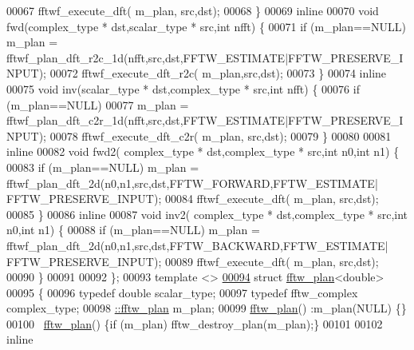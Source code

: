 \begin{DoxyCode}
00067           fftwf\_execute\_dft( m\_plan, src,dst);
00068       \}
00069       \textcolor{keyword}{inline}
00070       \textcolor{keywordtype}{void} fwd(complex\_type * dst,scalar\_type * src,\textcolor{keywordtype}{int} nfft) \{
00071           \textcolor{keywordflow}{if} (m\_plan==NULL) m\_plan = fftwf\_plan\_dft\_r2c\_1d(nfft,src,dst,FFTW\_ESTIMATE|FFTW\_PRESERVE\_INPUT);
00072           fftwf\_execute\_dft\_r2c( m\_plan,src,dst);
00073       \}
00074       \textcolor{keyword}{inline}
00075       \textcolor{keywordtype}{void} inv(scalar\_type * dst,complex\_type * src,\textcolor{keywordtype}{int} nfft) \{
00076           \textcolor{keywordflow}{if} (m\_plan==NULL)
00077               m\_plan = fftwf\_plan\_dft\_c2r\_1d(nfft,src,dst,FFTW\_ESTIMATE|FFTW\_PRESERVE\_INPUT);
00078           fftwf\_execute\_dft\_c2r( m\_plan, src,dst);
00079       \}
00080 
00081       \textcolor{keyword}{inline} 
00082       \textcolor{keywordtype}{void} fwd2( complex\_type * dst,complex\_type * src,\textcolor{keywordtype}{int} n0,\textcolor{keywordtype}{int} n1) \{
00083           \textcolor{keywordflow}{if} (m\_plan==NULL) m\_plan = fftwf\_plan\_dft\_2d(n0,n1,src,dst,FFTW\_FORWARD,FFTW\_ESTIMATE|
      FFTW\_PRESERVE\_INPUT);
00084           fftwf\_execute\_dft( m\_plan, src,dst);
00085       \}
00086       \textcolor{keyword}{inline} 
00087       \textcolor{keywordtype}{void} inv2( complex\_type * dst,complex\_type * src,\textcolor{keywordtype}{int} n0,\textcolor{keywordtype}{int} n1) \{
00088           \textcolor{keywordflow}{if} (m\_plan==NULL) m\_plan = fftwf\_plan\_dft\_2d(n0,n1,src,dst,FFTW\_BACKWARD,FFTW\_ESTIMATE|
      FFTW\_PRESERVE\_INPUT);
00089           fftwf\_execute\_dft( m\_plan, src,dst);
00090       \}
00091 
00092   \};
00093   \textcolor{keyword}{template} <> 
\hyperlink{struct_eigen_1_1internal_1_1fftw__plan_3_01double_01_4}{00094}   \textcolor{keyword}{struct }\hyperlink{struct_eigen_1_1internal_1_1fftw__plan}{fftw\_plan}<double>
00095   \{
00096       \textcolor{keyword}{typedef} \textcolor{keywordtype}{double} scalar\_type;
00097       \textcolor{keyword}{typedef} fftw\_complex complex\_type;
00098       \hyperlink{struct_eigen_1_1internal_1_1fftw__plan}{::fftw\_plan} m\_plan;
00099       \hyperlink{struct_eigen_1_1internal_1_1fftw__plan}{fftw\_plan}() :m\_plan(NULL) \{\}
00100       ~\hyperlink{struct_eigen_1_1internal_1_1fftw__plan}{fftw\_plan}() \{\textcolor{keywordflow}{if} (m\_plan) fftw\_destroy\_plan(m\_plan);\}
00101 
00102       \textcolor{keyword}{inline}

\end{DoxyCode}
